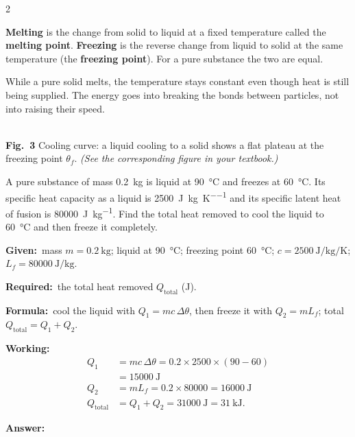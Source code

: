 \documentclass[10pt]{article}
\newcommand{\Given}{\par\vspace{2pt}\textbf{Given:}\ }
\newcommand{\Required}{\par\vspace{2pt}\textbf{Required:}\ }
\newcommand{\Formula}{\par\vspace{2pt}\textbf{Formula:}\ }
\newcommand{\Working}{\par\vspace{2pt}\textbf{Working:}}
\newcommand{\Answer}[1]{\par\vspace{2pt}\textbf{Answer:}\ \fbox{#1}}
\begin{document}
\begin{multicols}{2}
\begin{definition}
\textbf{Melting} is the change from solid to liquid at a fixed
temperature called the \textbf{melting point}. \textbf{Freezing} is the
reverse change from liquid to solid at the same temperature (the
\textbf{freezing point}). For a pure substance the two are equal.
\end{definition}

\begin{nb}
While a pure solid melts, the temperature stays constant even though
heat is still being supplied. The energy goes into breaking the bonds
between particles, not into raising their speed.
\end{nb}

\begin{center}
\\[2pt]
{\scriptsize\textbf{Fig.\ 3} Cooling curve: a liquid cooling to a solid
shows a flat plateau at the freezing point $\theta_f$.
\textit{(See the corresponding figure in your textbook.)}}
\end{center}

\begin{example}
A pure substance of mass \SI{0.2}{\kilogram} is liquid at
\SI{90}{\degreeCelsius} and freezes at \SI{60}{\degreeCelsius}. Its
specific heat capacity as a liquid is
\SI{2500}{\joule\per\kilogram\per\kelvin} and its specific latent heat
of fusion is \SI{80000}{\joule\per\kilogram}. Find the total heat
removed to cool the liquid to \SI{60}{\degreeCelsius} and then freeze it
completely.
\tcblower
\Given mass $m = \SI{0.2}{\kilogram}$; liquid at
\SI{90}{\degreeCelsius}; freezing point \SI{60}{\degreeCelsius};
$c = \SI{2500}{\joule\per\kilogram\per\kelvin}$;
$L_f = \SI{80000}{\joule\per\kilogram}$.
\Required the total heat removed $Q_{\text{total}}$ (\si{\joule}).
\Formula cool the liquid with $Q_1 = m c\,\Delta\theta$, then freeze it
with $Q_2 = m L_f$; total $Q_{\text{total}} = Q_1 + Q_2$.
\Working
\begin{align*}
  Q_1 &= m c \,\Delta\theta = 0.2 \times 2500 \times (90 - 60) \\
      &= \SI{15000}{\joule} \\
  Q_2 &= m L_f = 0.2 \times 80000 = \SI{16000}{\joule} \\
  Q_{\text{total}} &= Q_1 + Q_2 = \SI{31000}{\joule} = \SI{31}{\kilo\joule}.
\end{align*}
\Answer{$Q_{\text{total}} = \SI{31}{\kilo\joule}$}
\end{example}


\end{multicols}
\end{document}
